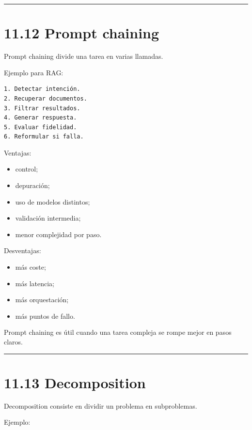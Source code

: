 \begin{center}\rule{0.5\linewidth}{0.5pt}\end{center}

\section{11.12 Prompt chaining}\label{prompt-chaining-1}

Prompt chaining divide una tarea en varias llamadas.

Ejemplo para RAG:

\begin{lstlisting}
1. Detectar intención.
2. Recuperar documentos.
3. Filtrar resultados.
4. Generar respuesta.
5. Evaluar fidelidad.
6. Reformular si falla.
\end{lstlisting}

Ventajas:

\begin{itemize}
\tightlist
\item
  control;
\item
  depuración;
\item
  uso de modelos distintos;
\item
  validación intermedia;
\item
  menor complejidad por paso.
\end{itemize}

Desventajas:

\begin{itemize}
\tightlist
\item
  más coste;
\item
  más latencia;
\item
  más orquestación;
\item
  más puntos de fallo.
\end{itemize}

Prompt chaining es útil cuando una tarea compleja se rompe mejor en
pasos claros.

\begin{center}\rule{0.5\linewidth}{0.5pt}\end{center}

\section{11.13 Decomposition}\label{decomposition}

Decomposition consiste en dividir un problema en subproblemas.

Ejemplo:

